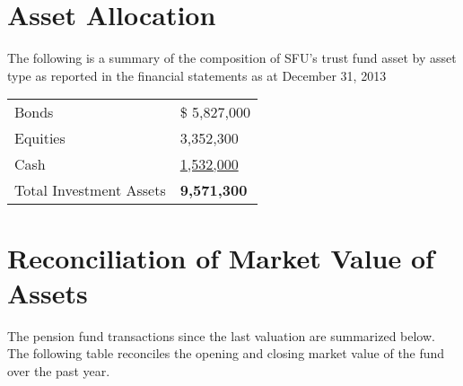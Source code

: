 \documentclass{report}
\begin{document}
\section{Asset Allocation}
The following is a summary of the composition of SFU's trust fund asset by asset type as reported in the financial statements as at December 31, 2013

\bgroup
\normalsize
\def\arraystretch{1.5}
\begin{longtable}[l]{p{8.5cm} p{6cm}}
Bonds & \$ \hspace{5mm} 5,827,000 \\
Equities & \hspace{8mm} 3,352,300 \\
Cash &  \hspace{1mm} \uline{\hspace{6mm} 1,532,000} \\ 
Total Investment Assets & \hspace{8mm} \textbf{9,571,300} \\
\end{longtable}
\egroup

\section{Reconciliation of Market Value of Assets}

The pension fund transactions since the last valuation are summarized below. The following table reconciles the opening and closing market value of the fund over the past year.
\end{document}
